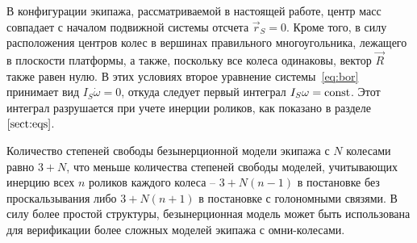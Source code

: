 
В конфигурации экипажа, рассматриваемой в настоящей работе, центр масс совпадает с началом подвижной системы отсчета $\vec{r}_S = 0$. Кроме того, в силу расположения центров колес в вершинах правильного многоугольника, лежащего в плоскости платформы, а также, поскольку все колеса одинаковы, вектор $\vec{R}$ также равен нулю. В этих условиях второе уравнение системы~\ref{eq:bor} принимает вид $I_S\dot{\omega} = 0$, откуда следует первый интеграл $I_S\omega = \mathrm{const}$. Этот интеграл разрушается при учете инерции роликов, как показано в разделе~$\ref{sect:eqs}$.

Количество степеней свободы безынерционной модели экипажа с $N$ колесами равно $3 + N$, что меньше количества степеней свободы моделей, учитывающих инерцию всех $n$ роликов каждого колеса -- $3 + N(n - 1)$ в постановке без проскальзывания либо $3 + N(n + 1)$ в постановке с голономными связями. В силу более простой структуры, безынерционная модель может быть использована для верификации более сложных моделей экипажа с омни-колесами.